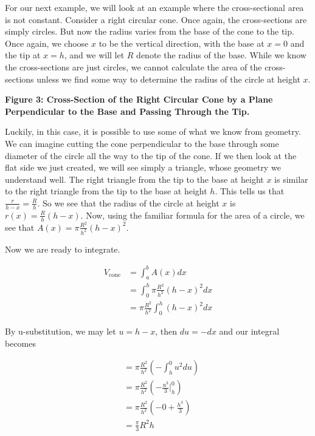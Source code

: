 For our next example, we will look at an example where the cross-sectional area is not constant. Consider a right circular cone. Once again, the cross-sections are simply circles. But now the radius varies from the base of the cone to the tip. Once again, we choose $x$ to be the vertical direction, with the base at $x=0$ and the tip at $x=h$, and we will let $R$ denote the radius of the base. While we know the cross-sections are just circles, we cannot calculate the area of the cross-sections unless we find some way to determine the radius of the circle at height $x$.

\textbf{Figure 3: Cross-Section of the Right Circular Cone by a Plane Perpendicular to the Base and Passing Through the Tip.}

Luckily, in this case, it is possible to use some of what we know from geometry. We can imagine cutting the cone perpendicular to the base through some diameter of the circle all the way to the tip of the cone. If we then look at the flat side we just created, we will see simply a triangle, whose geometry we understand well. The right triangle from the tip to the base at height $x$ is similar to the right triangle from the tip to the base at height $h$. This tells us that $\frac{r}{h-x} = \frac{R}{h}$. So we see that the radius of the circle at height $x$ is $r(x) = \frac{R}{h}(h-x)$. Now, using the familiar formula for the area of a circle, we see that $A(x) = \pi \frac{R^2}{h^2}(h-x)^2$.

Now we are ready to integrate.

\begin{align}
V_{\mathrm{cone}} &= \int_a^b A(x) dx\\
&= \int_0^h \pi \frac{R^2}{h^2}(h-x)^2 dx\\
&= \pi \frac{R^2}{h^2} \int_0^h (h-x)^2 dx
\end{align}

By u-substitution, we may let $u = h-x$, then $du = -dx$ and our integral becomes

\begin{align}
&= \pi \frac{R^2}{h^2} \left(-\int_h^0 u^2 du\right)\\
&= \pi \frac{R^2}{h^2} \left(-\frac{u^3}{3} \bigg|_h^0\right)\\
&= \pi \frac{R^2}{h^2} \left(-0 + \frac{h^3}{3}\right)\\
&= \frac{\pi}{3} R^2 h
\end{align}

